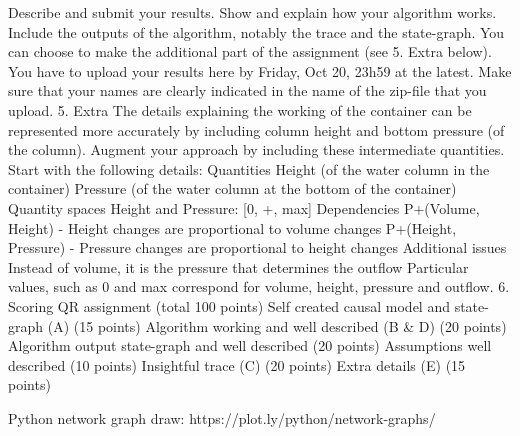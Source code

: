 Describe and submit your results. Show and explain how your algorithm works. Include the outputs of the algorithm, notably the trace and the state-graph.
You can choose to make the additional part of the assignment (see 5. Extra below).
You have to upload your results here by Friday, Oct 20, 23h59 at the latest. Make sure that your names are clearly indicated in the name of the zip-file that you upload.
5. Extra
The details explaining the working of the container can be represented more accurately by including column height and bottom pressure (of the column). Augment your approach by including these intermediate quantities. Start with the following details:
Quantities
Height (of the water column in the container)
Pressure (of the water column at the bottom of the container)
Quantity spaces
Height and Pressure: [0, +, max]
Dependencies
P+(Volume, Height) - Height changes are proportional to volume changes
P+(Height, Pressure) - Pressure changes are proportional to height changes
Additional issues
Instead of volume, it is the pressure that determines the outflow
Particular values, such as 0 and max correspond for volume, height, pressure and outflow.
6. Scoring QR assignment (total 100 points)
Self created causal model and state-graph (A) (15 points)
Algorithm working and well described (B & D) (20 points)
Algorithm output state-graph and well described (20 points)
Assumptions well described (10 points)
Insightful trace (C) (20 points)
Extra details (E) (15 points)

Python network graph draw: https://plot.ly/python/network-graphs/
